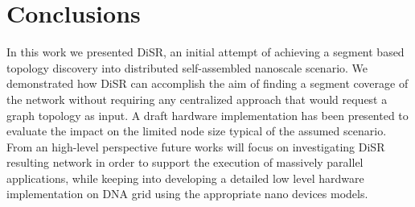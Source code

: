 \documentclass[final,journal]{IEEEtran}
\newcommand{\disr}{{\sf DiSR}}
\begin{document}

\section{Conclusions}
In this work we presented \disr{}, an initial attempt of achieving a segment based
topology discovery into distributed self-assembled nanoscale scenario. We
demonstrated how \disr{} can accomplish the aim of finding a segment
coverage of the network without requiring any centralized approach
that would request a graph topology as input. A draft hardware
implementation has been presented to evaluate the impact on the limited
node size typical of the assumed scenario. From an high-level
perspective future works will focus on
investigating \disr{} resulting network in order to support the
execution of massively parallel applications, while keeping into
developing a detailed low level hardware implementation on
DNA grid using the appropriate nano devices models.


\balance

 


\end{document}
